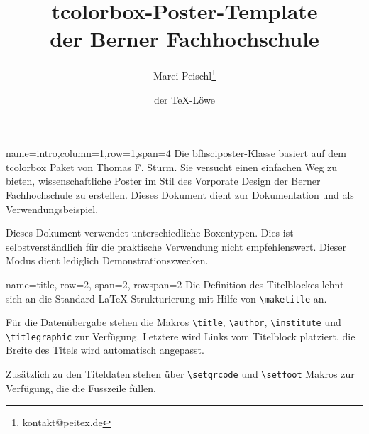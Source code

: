 \documentclass[
	paper=a0,%
	style=ruled, %
	]{bfhsciposter}
\newcommand{\tbs}{\textbackslash}
\let\code\texttt
\newcommand*{\macro}[1]{\code{\tbs#1}}
\let\pck\textsf
\let\cls\textsf
\begin{document}
\title{\pck{tcolorbox}-Poster-Template\\
	der Berner Fachhochschule}
\author{Marei Peischl\inst{*}\thanks{kontakt@peitex.de} \and der \TeX-Löwe}


\begin{tcbposter}[
		poster={
				columns=4,
				rows=7,
				spacing=1cm,
			},]

	\begin{posterboxenv}[,BFH-abstract,title=Zusammenfassung]{name=intro,column=1,row=1,span=4}
		Die \cls{bfhsciposter}-Klasse basiert auf dem \pck{tcolorbox} Paket von Thomas F. Sturm.
		Sie versucht einen einfachen Weg zu bieten, wissenschaftliche Poster im Stil des Vorporate Design der Berner Fachhochschule zu erstellen. Dieses Dokument dient zur Dokumentation und als Verwendungsbeispiel.

		Dieses Dokument verwendet unterschiedliche Boxentypen. Dies ist selbstverständlich für die praktische Verwendung nicht empfehlenswert. Dieser Modus dient lediglich Demonstrationszwecken.
	\end{posterboxenv}

	\begin{posterboxenv}[title=Titelei]{name=title, row=2, span=2, rowspan=2}
		Die Definition des Titelblockes lehnt sich an die Standard-\LaTeX{}-Strukturierung  mit Hilfe von \macro{maketitle} an.

		Für die Datenübergabe stehen die Makros \macro{title}, \macro{author}, \macro{institute} und \macro{titlegraphic} zur Verfügung. Letztere wird Links vom Titelblock platziert, die Breite des Titels wird automatisch angepasst.

		Zusätzlich zu den Titeldaten stehen über \macro{setqrcode} und \macro{setfoot} Makros zur Verfügung, die die Fusszeile füllen.
	\end{posterboxenv}


\end{tcbposter}
\end{document}
